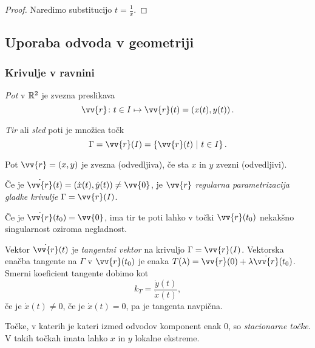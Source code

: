 \documentclass[12pt, a4paper]{article}
\begin{document}
\begin{proof}
Naredimo substitucijo $t=\frac{1}{x}$.
\end{proof}

\newpage

\subsection{Uporaba odvoda v geometriji}

\subsubsection{Krivulje v ravnini}

\begin{definicija}
\emph{Pot} v $\mathbb{R}^2$ je zvezna preslikava
\[
\vv{r}\colon t\in I\mapsto\vv{r}(t)=\left(x(t),y(t)\right).
\]
\end{definicija}

\begin{definicija}
\emph{Tir}
 ali \emph{sled} poti je množica točk
\[
\Gamma=\vv{r}(I)=\setb{\vv{r}(t)}{t\in I}.
\]
\end{definicija}

\begin{definicija}
Pot $\vv{r}=(x,y)$ je zvezna (odvedljiva), če sta $x$ in $y$ zvezni (odvedljivi).
\end{definicija}

\begin{definicija}
Če je $\dot{\vv{r}}(t)=(\dot{x}(t),\dot{y}(t))\ne\vv{0}$, je $\vv{r}$ \emph{regularna parametrizacija gladke krivulje} $\Gamma=\vv{r}(I)$.
\end{definicija}

\begin{opomba}
Če je $\dot{\vv{r}}(t_0)=\vv{0}$, ima tir te poti lahko v točki $\vv{r}(t_0)$ nekakšno singularnost oziroma negladnost.
\end{opomba}

\begin{definicija}
Vektor $\dot{\vv{r}}(t)$ je \emph{tangentni vektor} na krivuljo $\Gamma=\vv{r}(I)$. Vektorska enačba tangente na $\Gamma$ v $\vv{r}(t_0)$ je enaka $T(\lambda)=\vv{r}(0)+\lambda\dot{\vv{r}}(t_0)$. Smerni koeficient tangente dobimo kot
\[
k_T=\frac{\dot{y}(t)}{\dot{x}(t)},
\]
če je $\dot{x}(t)\ne 0$, če je $\dot{x}(t)=0$, pa je tangenta navpična.
\end{definicija}

\begin{definicija}
Točke, v katerih je kateri izmed odvodov komponent enak $0$, so \emph{stacionarne točke}. V takih točkah imata lahko $x$ in $y$ lokalne ekstreme.
\end{definicija}
\end{document}
